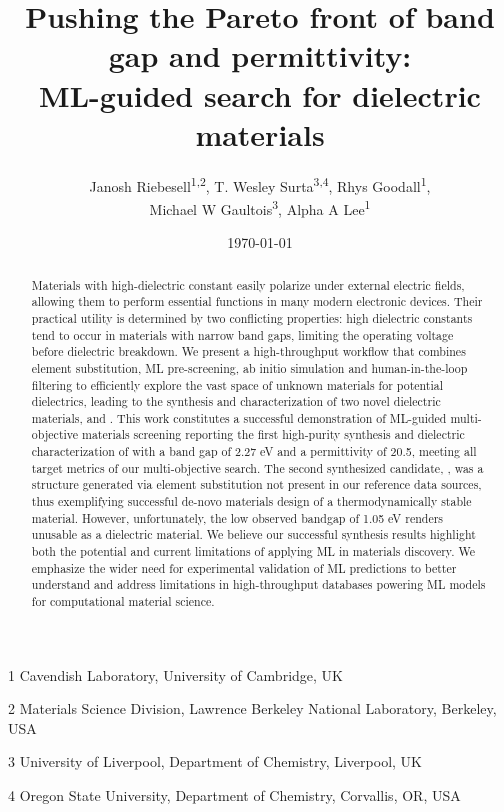 \documentclass{article}
\title{
  Pushing the Pareto front of band gap and permittivity:\\
  ML-guided search for dielectric materials
}
\newcommand{\CsTaTeO}[1][]{\ch{CsTaTeO6#1}}
\newcommand{\BiZrO}[1][]{\ch{Bi2Zr2O7#1}}
\newcommand{\affiliation}[1]{
  \begingroup
  \centering
  \small#1\par
  \endgroup
}
\newcommand{\affil}[1]{\textsuperscript{{#1}}}
\begin{document}
\author{Janosh Riebesell\affil{1,2}, T. Wesley Surta\affil{3,4}, Rhys Goodall\affil{1},\\[1ex]Michael W Gaultois\affil{3}, Alpha A Lee\affil{1}}
\date{\today}

\maketitle
\affiliation{1 Cavendish Laboratory, University of Cambridge, UK}
\affiliation{2 Materials Science Division, Lawrence Berkeley National Laboratory, Berkeley, USA}
\affiliation{3 University of Liverpool, Department of Chemistry, Liverpool, UK}
\affiliation{4 Oregon State University, Department of Chemistry, Corvallis, OR, USA}

\vskip 0.5cm

\begin{abstract}

    Materials with high-dielectric constant easily polarize under external electric fields, allowing them to perform essential functions in many modern electronic devices.
    Their practical utility is determined by two conflicting properties: high dielectric constants tend to occur in materials with narrow band gaps, limiting the operating voltage before dielectric breakdown.
    We present a high-throughput workflow that combines element substitution, ML pre-screening, ab initio simulation and human-in-the-loop filtering to efficiently explore the vast space of unknown materials for potential dielectrics, leading to the synthesis and characterization of two novel dielectric materials, \CsTaTeO{} and \BiZrO{}.
    This work constitutes a successful demonstration of ML-guided multi-objective materials screening reporting the first high-purity synthesis and dielectric characterization of \BiZrO{} with a band gap of 2.27 eV and a permittivity of 20.5, meeting all target metrics of our multi-objective search.
    The second synthesized candidate, \CsTaTeO{}, was a structure generated via element substitution not present in our reference data sources, thus exemplifying successful de-novo materials design of a thermodynamically stable material.
    However, unfortunately, the low observed bandgap of 1.05 eV renders \CsTaTeO{} unusable as a dielectric material.
    We believe our successful synthesis results highlight both the potential and current limitations of applying ML in materials discovery.
    We emphasize the wider need for experimental validation of ML predictions to better understand and address limitations in high-throughput databases powering ML models for computational material science.

\end{abstract}
\end{document}
